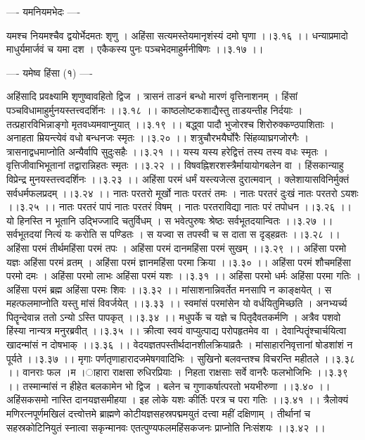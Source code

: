 \documentclass[11pt]{book}
\begin{document}
\begin{landscape}
---- यमनियमभेदः ----

यमश्च नियमश्चैव द्वयोर्भेदमतः शृणु ।
अहिंसा सत्यमस्तेयमानृशंस्यं दमो घृणा ।।३.१६ ।।
धन्याप्रमादो माधुर्यमार्जवं च यमा दश ।
एकैकस्य पुनः पञ्चभेदमाहुर्मनीषिणः ।।३.१७ ।।

---- यमेष्व{ }हिंसा (१) ----

अहिंसादि प्रवक्ष्यामि शृणुष्वावहितो द्विज ।
त्रासनं ताडनं बन्धो मारणं वृत्तिनाशनम् ।
हिंसां पञ्चविधामाहुर्मुनयस्तत्त्वदर्शिनः ।।३.१८ ।।
काष्ठलोष्टकशाद्यैस्तु ताडयन्तीह निर्दयाः ।
तत्प्रहारविभिन्नाङ्गो मृतवध्यमवाप्नुयात् ।।३.१९ ।।
बद्ध्वा पादौ भुजोरश्च शिरोरुक्कण्ठपाशिताः ।
अनाहता म्रियन्त्येवं वधो बन्धनजः स्मृतः ।।३.२० ।।
शत्रुचौरभयैर्घोरैः सिंहव्याघ्रगजोरगैः ।
त्रासनाद्वधमाप्नोति अन्यैर्वापि सुदुःसहैः ।।३.२१ ।।
यस्य यस्य हरेद्वित्तं तस्य तस्य वधः स्मृतः ।
वृत्तिजीवाभिभूतानां तद्वारान्निहतः स्मृतः ।।३.२२ ।।
विषवह्निशरशस्त्रैर्मायायोगबलेन वा ।
हिंसकान्याहु विप्रेन्द्र मुनयस्तत्त्वदर्शिनः ।।३.२३ ।।
अहिंसा परमं धर्मं यस्त्यजेत्स दुरात्मवान् ।
क्लेशायासविनिर्मुक्तं सर्वधर्मफलप्रदम् ।।३.२४ ।।
नातः परतरो मूर्खो नातः परतरं तमः ।
नातः परतरं दुःखं नातः परतरो ऽयशः ।।३.२५ ।।
नातः परतरं पापं नातः परतरं विषम् ।
नातः परतराविद्या नातः परं तपोधन ।।३.२६ ।।
यो हिनस्ति न भूतानि उद्भिज्जादि चतुर्विधम् ।
स भवेत्पुरुषः श्रेष्ठः सर्वभूतदयान्वितः ।।३.२७ ।।
सर्वभूतदयां नित्यं यः करोति स पण्डितः ।
स यज्वा स तपस्वी च स दाता स दृड्हव्रतः ।।३.२८ ।।
अहिंसा परमं तीर्थमहिंसा परमं तपः ।
अहिंसा परमं दानमहिंसा परमं सुखम् ।।३.२९ ।।
अहिंसा परमो यज्ञः अहिंसा परमं व्रतम् ।
अहिंसा परमं ज्ञानमहिंसा परमा क्रिया ।।३.३० ।।
अहिंसा परमं शौचमहिंसा परमो दमः ।
अहिंसा परमो लाभः अहिंसा परमं यशः ।।३.३१ ।।
अहिंसा परमो धर्मः अहिंसा परमा गतिः ।
अहिंसा परमं ब्रह्म अहिंसा परमः शिवः ।।३.३२ ।।
मांसाशनान्निवर्तेत मनसापि न काङ्क्षयेत् ।
स महत्फलमाप्नोति यस्तु मांसं विवर्जयेत् ।।३.३३ ।।
स्वमांसं परमांसेन यो वर्धयितुमिच्छति ।
अनभ्यर्च्य पितॄन्देवान्न ततो ऽन्यो ऽस्ति पापकृत् ।।३.३४ ।।
मधुपर्के च यज्ञे च पितृदैवतकर्मणि ।
अत्रैव पशवो हिंस्या नान्यत्र मनुरब्रवीत् ।।३.३५ ।।
क्रीत्वा स्वयं वाप्युत्पाद्य परोपहृतमेव वा ।
देवान्पितॄंश्चार्चयित्वा खादन्मांसं न दोषभाक् ।।३.३६ ।।
वेदयज्ञतपस्तीर्थदानशीलक्रियाव्रतैः ।
मांसाहारनिवृत्तानां षोडशांशं न पूर्यते ।।३.३७ ।।
मृगाः पर्णतृणाहारादजमेषगवादिभिः ।
सुखिनो बलवन्तश्च विचरन्ति महीतले ।।३.३८ ।।
वानराः फल{ ।}म{ ।}ाहारा राक्षसा रुधिरप्रियाः ।
निहता राक्षसाः सर्वे वानरैः फलभोजिभिः ।।३.३९ ।।
तस्मान्मांसं न हीहेत बलकामेन भो द्विज ।
बलेन च गुणाकर्षात्परतो भयभीरुणा ।।३.४० ।।
अहिंसकसमो नास्ति दानयज्ञसमीहया ।
इह लोके यशः कीर्तिः परत्र च परा गतिः ।।३.४१ ।।
त्रैलोक्यं मणिरत्नपूर्णमखिलं दत्त्वोत्तमे ब्राह्मणे
कोटीयज्ञसहस्रपद्ममयुतं दत्त्वा महीं दक्षिणाम् ।
तीर्थानां च सहस्रकोटिनियुतं स्नात्वा सकृन्मानवः
एतत्पुण्यफलमहिंसकजनः प्राप्नोति निःसंशयः ।।३.४२ ।।


\end{landscape}
\end{document}
